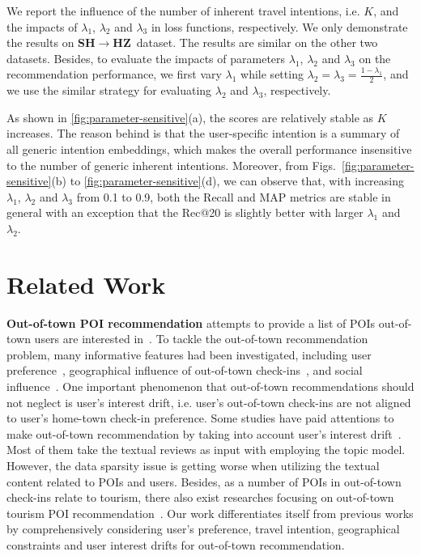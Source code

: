\documentclass[letterpaper]{article} %
\newcommand{\shhz}{{\bf SH\ensuremath{\rightarrow}HZ}}
\begin{document}
We report the influence of the number of inherent travel intentions, i.e. $K$, and the impacts of $\lambda_1$, $\lambda_2$ and $\lambda_3$ in loss functions, respectively.
We only demonstrate the results on \shhz~dataset.
The results are similar on the other two datasets.
Besides, to evaluate the impacts of parameters $\lambda_1$, $\lambda_2$ and $\lambda_3$ on the recommendation performance, we first vary $\lambda_1$ while setting $\lambda_2 = \lambda_3 = \frac{1-\lambda_1}{2}$, and we use the similar strategy for evaluating $\lambda_2$ and $\lambda_3$, respectively.

As shown in \cref{fig:parameter-sensitive}(a), the scores are relatively stable as $K$ increases.
The reason behind is that the user-specific intention is a summary of all generic intention embeddings, which makes the overall performance insensitive to the number of generic inherent intentions.
Moreover, from Figs.~\ref{fig:parameter-sensitive}(b) to \ref{fig:parameter-sensitive}(d), we can observe that,
with increasing $\lambda_1$, $\lambda_2$ and $\lambda_3$ from 0.1 to 0.9, both the Recall and MAP metrics are stable in general with an exception that the Rec@20 is slightly better with larger $\lambda_1$ and $\lambda_2$.


\section{Related Work}

{\bf{Out-of-town POI recommendation}}
attempts to provide a list of POIs out-of-town users are interested in~\cite{wang2017location}.
To tackle the out-of-town recommendation problem, many informative features had been investigated, including user preference~\cite{ference2013location}, geographical influence of out-of-town check-ins~\cite{ference2013location,pham2017general}, and social influence~\cite{ference2013location}.
One important phenomenon that out-of-town recommendations should not neglect is user's interest drift, i.e. user's out-of-town check-ins are not aligned to user's home-town check-in preference.
Some studies have paid attentions to make out-of-town recommendation by taking into account user's interest drift~\cite{yin2014lcars,yin2016joint,wang2017location}.
Most of them take the textual reviews as input with employing the topic model.
However, the data sparsity issue is getting worse when utilizing the textual content related to POIs and users.
Besides, as a number of POIs in out-of-town check-ins relate to tourism, there also exist researches focusing on out-of-town tourism POI recommendation~\cite{liu2011personalized,brilhante2013shall,hu2017unifying}.
Our work differentiates itself from previous works by comprehensively considering user's preference, travel intention, geographical constraints and user interest drifts for out-of-town recommendation.
\end{document}
